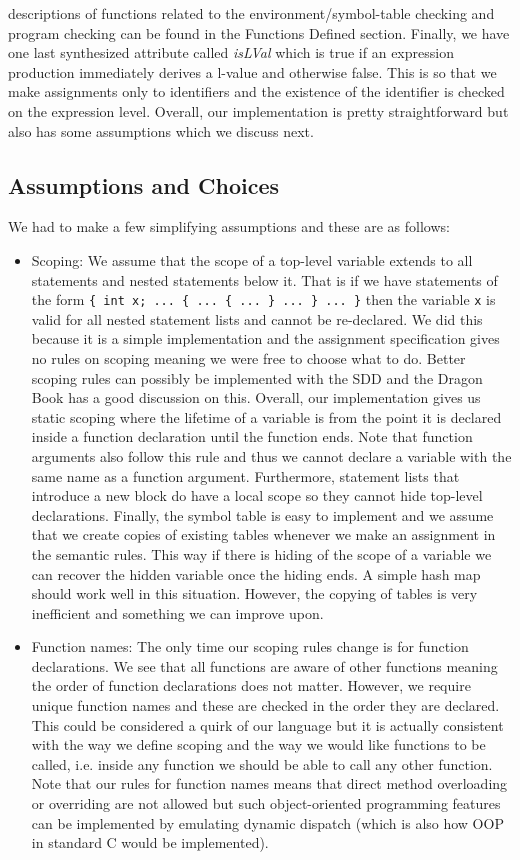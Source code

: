 \documentclass{article}
\begin{document}
descriptions of functions related to the environment/symbol-table checking and program checking can be found in the Functions Defined section. Finally, we have one last synthesized attribute called \textit{isLVal} which is true if an expression production immediately derives a l-value and otherwise false. This is so that we make assignments only to identifiers and the existence of the identifier is checked on the expression level. Overall, our implementation is pretty straightforward but also has some assumptions which we discuss next.

\subsection{Assumptions and Choices}
We had to make a few simplifying assumptions and these are as follows:
\begin{itemize}
    \item Scoping: We assume that the scope of a top-level variable extends to all statements and nested statements below it. That is if we have statements of the form \texttt{\{ int x; ... \{ ... \{ ... \} ... \} ... \}} then the variable \texttt{x} is valid for all nested statement lists and cannot be re-declared. We did this because it is a simple implementation and the assignment specification gives no rules on scoping meaning we were free to choose what to do. Better scoping rules can possibly be implemented with the SDD and the Dragon Book has a good discussion on this. Overall, our implementation gives us static scoping where the lifetime of a variable is from the point it is declared inside a function declaration until the function ends. Note that function arguments also follow this rule and thus we cannot declare a variable with the same name as a function argument. Furthermore, statement lists that introduce a new block do have a local scope so they cannot hide top-level declarations. Finally, the symbol table is easy to implement and we assume that we create copies of existing tables whenever we make an assignment in the semantic rules. This way if there is hiding of the scope of a variable we can recover the hidden variable once the hiding ends. A simple hash map should work well in this situation. However, the copying of tables is very inefficient and something we can improve upon.
    \item Function names: The only time our scoping rules change is for function declarations. We see that all functions are aware of other functions meaning the order of function declarations does not matter. However, we require unique function names and these are checked in the order they are declared. This could be considered a quirk of our language but it is actually consistent with the way we define scoping and the way we would like functions to be called, i.e. inside any function we should be able to call any other function. Note that our rules for function names means that direct method overloading or overriding are not allowed but such object-oriented programming features can be implemented by emulating dynamic dispatch (which is also how OOP in standard C would be implemented).

\end{itemize}
\end{document}

